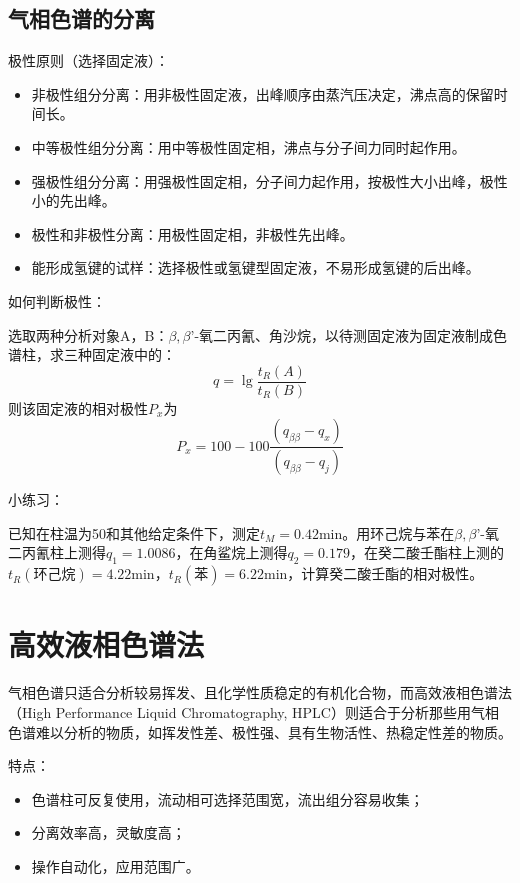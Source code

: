 \subsection{气相色谱的分离}
极性原则（选择固定液）：
\begin{itemize}
	\item 非极性组分分离：用非极性固定液，出峰顺序由蒸汽压决定，沸点高的保留时间长。
	\item 中等极性组分分离：用中等极性固定相，沸点与分子间力同时起作用。
	\item 强极性组分分离：用强极性固定相，分子间力起作用，按极性大小出峰，极性小的先出峰。
	\item 极性和非极性分离：用极性固定相，非极性先出峰。
	\item 能形成氢键的试样：选择极性或氢键型固定液，不易形成氢键的后出峰。
\end{itemize}

如何判断极性：

\begin{example}
选取两种分析对象A，B：$\beta,\beta’$-氧二丙氰、角沙烷，以待测固定液为固定液制成色谱柱，求三种固定液中的：
\begin{equation*}
	q=\lg⁡\dfrac{t_R (A)}{t_R (B)}
\end{equation*}
则该固定液的相对极性$P_x$为
\begin{equation*}
	P_x=100-100 \dfrac{(q_{\beta\beta}-q_x)}{(q_{\beta\beta}-q_j)}
\end{equation*}
\end{example}

\noindent 小练习：
\begin{example}
	已知在柱温为50\textcelsius 和其他给定条件下，测定$t_M=0.42$min。用环己烷与苯在$\beta,\beta’$-氧二丙氰柱上测得$q_1=1.0086$，在角鲨烷上测得$q_2=0.179$，在癸二酸壬酯柱上测的$t_R(\text{环己烷})=4.22$min，$t_R(\text{苯})=6.22$min，计算癸二酸壬酯的相对极性。
\end{example}

\section{高效液相色谱法}

气相色谱只适合分析较易挥发、且化学性质稳定的有机化合物，而高效液相色谱法（High Performance Liquid Chromatography, HPLC）则适合于分析那些用气相色谱难以分析的物质，如挥发性差、极性强、具有生物活性、热稳定性差的物质。

特点：
\begin{itemize}
	\item 色谱柱可反复使用，流动相可选择范围宽，流出组分容易收集；
	\item 分离效率高，灵敏度高；
	\item 操作自动化，应用范围广。
\end{itemize}


